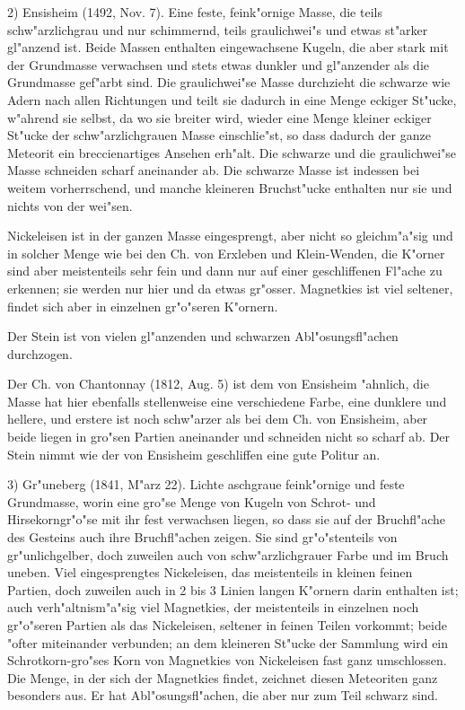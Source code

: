 \documentclass[a4paper, 11pt, oneside]{article}
\begin{document}
2) Ensisheim (1492, Nov. 7). Eine feste, feink"ornige Masse, die teils schw"arzlichgrau und nur schimmernd, teils graulichwei"s und etwas st"arker gl"anzend ist. Beide Massen enthalten eingewachsene Kugeln, die aber stark mit der Grundmasse verwachsen und stets etwas dunkler und gl"anzender als die Grundmasse gef"arbt sind. Die graulichwei"se Masse durchzieht die schwarze wie Adern nach allen Richtungen und teilt sie dadurch in eine Menge eckiger St"ucke, w"ahrend sie selbst, da wo sie breiter wird, wieder eine Menge kleiner eckiger St"ucke der schw"arzlichgrauen Masse einschlie"st, so dass dadurch der ganze Meteorit ein breccienartiges Ansehen erh"alt. Die schwarze und die graulichwei"se Masse schneiden scharf aneinander ab. Die schwarze Masse ist indessen bei weitem vorherrschend, und manche kleineren Bruchst"ucke enthalten nur sie und nichts von der wei"sen.

Nickeleisen ist in der ganzen Masse eingesprengt, aber nicht so gleichm"a"sig und in solcher Menge wie bei den Ch. von Erxleben und Klein-Wenden, die K"orner sind aber meistenteils sehr fein und dann nur auf einer geschliffenen Fl"ache zu erkennen; sie werden nur hier und da etwas gr"osser. Magnetkies ist viel seltener, findet sich aber in einzelnen gr"o"seren K"ornern.

Der Stein ist von vielen gl"anzenden und schwarzen Abl"osungsfl"achen durchzogen.

Der Ch. von Chantonnay (1812, Aug. 5) ist dem von Ensisheim "ahnlich, die Masse hat hier ebenfalls stellenweise eine verschiedene Farbe, eine dunklere und hellere, und erstere ist noch schw"arzer als bei dem Ch. von Ensisheim, aber beide liegen in gro"sen Partien aneinander und schneiden nicht so scharf ab. Der Stein nimmt wie der von Ensisheim geschliffen eine gute Politur an.

3) Gr"uneberg (1841, M"arz 22). Lichte aschgraue feink"ornige und feste Grundmasse, worin eine gro"se Menge von Kugeln von Schrot- und Hirsekorngr"o"se mit ihr fest verwachsen liegen, so dass sie auf der Bruchfl"ache des Gesteins auch ihre Bruchfl"achen zeigen. Sie sind gr"o"stenteils von gr"unlichgelber, doch zuweilen auch von schw"arzlichgrauer Farbe und im Bruch uneben. Viel eingesprengtes Nickeleisen, das meistenteils in kleinen feinen Partien, doch zuweilen auch in 2 bis 3 Linien langen K"ornern darin enthalten ist; auch verh"altnism"a"sig viel Magnetkies, der meistenteils in einzelnen noch gr"o"seren Partien als das Nickeleisen, seltener in feinen Teilen vorkommt; beide "ofter miteinander verbunden; an dem kleineren St"ucke der Sammlung wird ein Schrotkorn-gro"ses Korn von Magnetkies von Nickeleisen fast ganz umschlossen. Die Menge, in der sich der Magnetkies findet, zeichnet diesen Meteoriten ganz besonders aus. Er hat Abl"osungsfl"achen, die aber nur zum Teil schwarz sind.
\end{document}

